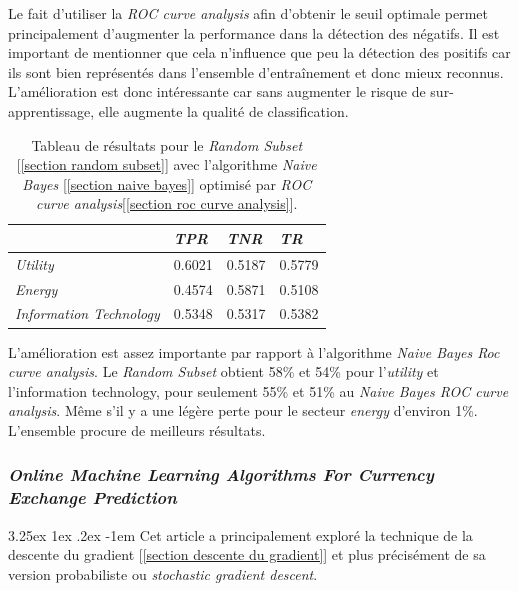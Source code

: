 \documentclass[a4paper, 11pt]{article}
\makeatletter
\newcounter{subsubsubsection}[subsubsection]
\renewcommand\paragraph{\@startsection{paragraph}{5}{\z@}%
  {3.25ex \@plus1ex \@minus.2ex}%
  {-1em}%
  {\normalfont\normalsize\bfseries}}
\makeatother
\begin{document}
Le fait d'utiliser la \textit{ROC curve analysis} afin d'obtenir le seuil optimale permet principalement d'augmenter la performance dans la détection des négatifs. Il est important de mentionner que cela n'influence que peu la détection des positifs car ils sont bien représentés dans l'ensemble d'entraînement et donc mieux reconnus. L'amélioration est donc intéressante car sans augmenter le risque de sur-apprentissage, elle augmente la qualité de classification.

\begin{table}[h!]
	\centering
\begin{tabular}{|l|l|l|l|}
	\hline
	\ & \textit{TPR} & \textit{TNR} & \textit{TR}\\
	\hline
	\textit{Utility} & 0.6021 & 0.5187 & 0.5779 \\
	\hline
	\textit{Energy} & 0.4574 & 0.5871 & 0.5108\\
	\hline
	\textit{Information Technology} & 0.5348 & 0.5317 & 0.5382\\
	\hline
\end{tabular}
\caption{Tableau de résultats pour le \textit{Random Subset} [\ref{section random subset}] avec l'algorithme \textit{Naive Bayes} [\ref{section naive bayes}] optimisé par \textit{ROC curve analysis}[\ref{section roc curve analysis}].}
\end{table}

L'amélioration est assez importante par rapport à l'algorithme \textit{Naive Bayes Roc curve analysis}. Le \textit{Random Subset} obtient 58\% et 54\% pour l'\textit{utility} et l'{information technology}, pour seulement 55\% et 51\% au \textit{Naive Bayes ROC curve analysis}. Même s'il y a une légère perte pour le secteur \textit{energy} d'environ 1\%.
L'ensemble procure de meilleurs résultats.

\subsubsection{\textit{Online Machine Learning Algorithms For Currency Exchange Prediction}\cite{descente_du_gradient_stochastique}}

\paragraph{}
Cet article a principalement exploré la technique de la descente du gradient [\ref{section descente du gradient}] et plus précisément de sa version probabiliste ou \textit{stochastic gradient descent}.
\end{document}
